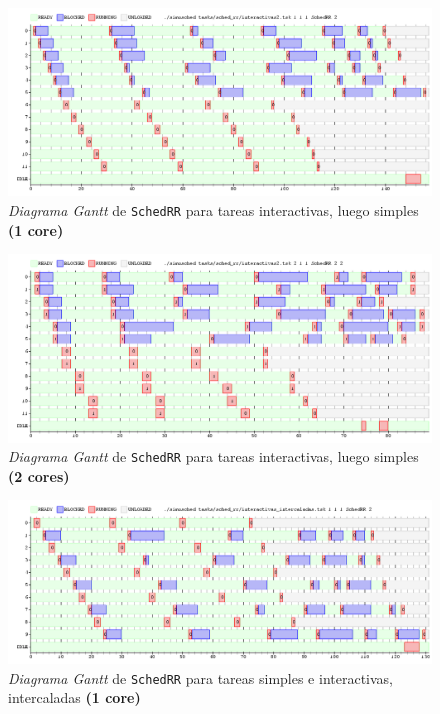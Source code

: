 \documentclass[11pt, a4paper, twoside]{article}
\begin{document}
\begin{figure}
  \centering
  \includegraphics [width=\textwidth]{../graficos/sched_rr/interactivas2-1.png}
  \caption{\emph{Diagrama Gantt} de \texttt{SchedRR} para tareas interactivas, luego simples \textbf{(1 core)}}
  \label{fig:gantt-sched-rr-interactivas2-1}
\end{figure}

\begin{figure}
  \centering
  \includegraphics [width=\textwidth]{../graficos/sched_rr/interactivas2-2.png}
  \caption{\emph{Diagrama Gantt} de \texttt{SchedRR} para tareas interactivas, luego simples \textbf{(2 cores)}}
  \label{fig:gantt-sched-rr-interactivas2-2}
\end{figure}

\begin{figure}
  \centering
  \includegraphics [width=\textwidth]{../graficos/sched_rr/interactivas-intercaladas-1.png}
  \caption{\emph{Diagrama Gantt} de \texttt{SchedRR} para tareas simples e interactivas, intercaladas \textbf{(1 core)}}
  \label{fig:gantt-sched-rr-interactivas-interrcaladas-1}
\end{figure}
\end{document}
